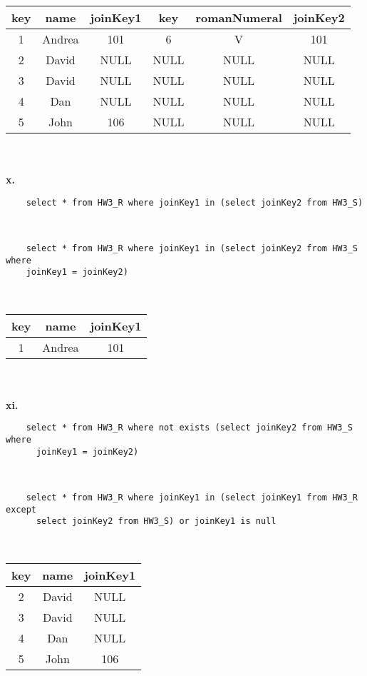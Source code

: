 \documentclass[12pt, letterpaper, fleqn]{article}
\begin{document}
  \begin{tabular}{ c c c c c c }
    key & name & joinKey1 & key & romanNumeral & joinKey2 \\
    \hline 
    1	&Andrea	&101	&6	&V	&101 \\
    2	&David	&NULL	&NULL	&NULL	&NULL \\
    3	&David	&NULL	&NULL	&NULL	&NULL \\
    4	&Dan	&NULL	&NULL	&NULL	&NULL \\
    5	&John	&106	&NULL	&NULL	&NULL 
  \end{tabular} \\\\

  \textbf{x.}\\
  \begin{verbatim}
    select * from HW3_R where joinKey1 in (select joinKey2 from HW3_S)
  \end{verbatim}\\
  \begin{verbatim}
    select * from HW3_R where joinKey1 in (select joinKey2 from HW3_S where
    joinKey1 = joinKey2)
  \end{verbatim}\\

  \begin{tabular}{ c c c}
    key & name & joinKey1 \\
    \hline 
    1	&Andrea	&101
  \end{tabular} \\\\

  \textbf{xi.}\\
  \begin{verbatim}
    select * from HW3_R where not exists (select joinKey2 from HW3_S where
      joinKey1 = joinKey2)
  \end{verbatim}\\
  \begin{verbatim}
    select * from HW3_R where joinKey1 in (select joinKey1 from HW3_R except
      select joinKey2 from HW3_S) or joinKey1 is null
  \end{verbatim}\\

  \begin{tabular}{ c c c}
    key & name & joinKey1 \\
    \hline 
    2	&David	&NULL \\
    3	&David	&NULL \\
    4	&Dan	&NULL \\
    5	&John	&106
  \end{tabular} \\\\
\end{document}
